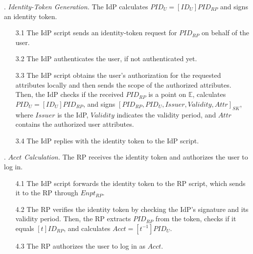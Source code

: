 . {\em Identity-Token Generation.}
The IdP calculates $PID_U = [ID_U]{PID_{RP}}$ and signs an identity token. %
\vspace{-\topsep}
\begin{itemize}
\setlength{\topsep}{0pt}
\setlength{\partopsep}{0pt}
\setlength{\itemsep}{0pt}
\setlength{\parsep}{0pt}
\setlength{\parskip}{0pt}
\item[3.1]
The IdP script sends an identity-token request for $PID_{RP}$ on behalf of the user. %

\item[3.2] The IdP authenticates the user, if not authenticated yet.

\item [3.3]
The IdP script obtains the user's authorization for the requested attributes locally and then sends the scope of the authorized attributes.
\newc
Then, the IdP checks if the received $PID_{RP}$ is a point on $\mathbb{E}$,
\oldc
calculates $PID_U = [ID_U]{PID_{RP}}$, and signs $[PID_{RP}, PID_U, Issuer, Validity, Attr]_{SK}$, where $Issuer$ is the IdP, $Validity$ indicates the validity period, and $Attr$ contains the authorized user attributes.
\item[3.4] The IdP replies with the identity token to the IdP script.
\end{itemize}

. {\em $Acct$ Calculation.}
The RP receives the identity token and authorizes the user to log in.
\vspace{-\topsep}
\begin{itemize}
\setlength{\topsep}{0pt}
\setlength{\partopsep}{0pt}
\setlength{\itemsep}{0pt}
\setlength{\parsep}{0pt}
\setlength{\parskip}{0pt}
\item [4.1]
The IdP script forwards the identity token to the RP script,
    which sends it to the RP through $Enpt_{RP}$.
\item[4.2] The RP verifies the identity token by checking the IdP's signature and its validity period.
Then, \newc
the RP extracts $PID_{RP}$ from the token, checks if it equals $[t]ID_{RP}$,
\oldc
and calculates $Acct = [t^{-1}]{PID_U}$.

\item [4.3] The RP authorizes the user to log in as $Acct$.

\end{itemize}


